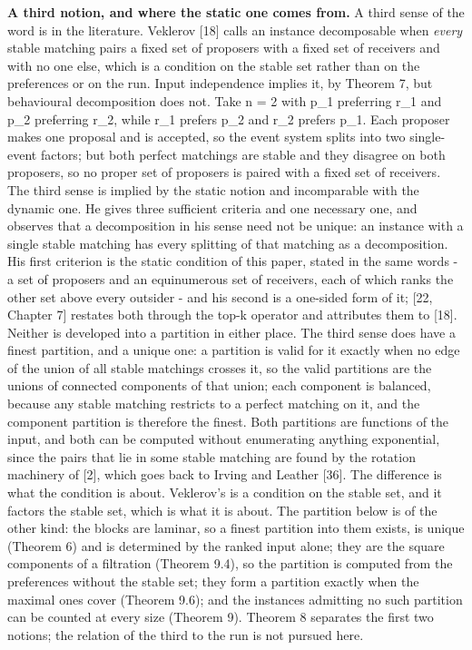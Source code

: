\documentclass[
  11pt,
]{article}
\begin{document}
\textbf{A third notion, and where the static one comes from.} A third
sense of the word is in the literature. Veklerov {[}18{]} calls an
instance decomposable when \emph{every} stable matching pairs a fixed
set of proposers with a fixed set of receivers and with no one else,
which is a condition on the stable set rather than on the preferences or
on the run. Input independence implies it, by Theorem 7, but behavioural
decomposition does not. Take n = 2 with p\_1 preferring r\_1 and p\_2
preferring r\_2, while r\_1 prefers p\_2 and r\_2 prefers p\_1. Each
proposer makes one proposal and is accepted, so the event system splits
into two single-event factors; but both perfect matchings are stable and
they disagree on both proposers, so no proper set of proposers is paired
with a fixed set of receivers. The third sense is implied by the static
notion and incomparable with the dynamic one. He gives three sufficient
criteria and one necessary one, and observes that a decomposition in his
sense need not be unique: an instance with a single stable matching has
every splitting of that matching as a decomposition. His first criterion
is the static condition of this paper, stated in the same words - a set
of proposers and an equinumerous set of receivers, each of which ranks
the other set above every outsider - and his second is a one-sided form
of it; {[}22, Chapter 7{]} restates both through the top-k operator and
attributes them to {[}18{]}. Neither is developed into a partition in
either place. The third sense does have a finest partition, and a unique
one: a partition is valid for it exactly when no edge of the union of
all stable matchings crosses it, so the valid partitions are the unions
of connected components of that union; each component is balanced,
because any stable matching restricts to a perfect matching on it, and
the component partition is therefore the finest. Both partitions are
functions of the input, and both can be computed without enumerating
anything exponential, since the pairs that lie in some stable matching
are found by the rotation machinery of {[}2{]}, which goes back to
Irving and Leather {[}36{]}. The difference is what the condition is
about. Veklerov's is a condition on the stable set, and it factors the
stable set, which is what it is about. The partition below is of the
other kind: the blocks are laminar, so a finest partition into them
exists, is unique (Theorem 6) and is determined by the ranked input
alone; they are the square components of a filtration (Theorem 9.4), so
the partition is computed from the preferences without the stable set;
they form a partition exactly when the maximal ones cover (Theorem 9.6);
and the instances admitting no such partition can be counted at every
size (Theorem 9). Theorem 8 separates the first two notions; the
relation of the third to the run is not pursued here.
\end{document}
